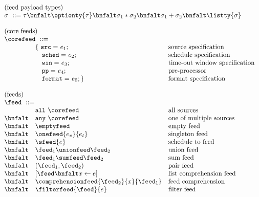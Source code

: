 \begin{figure}[t]
\[
\begin{array}{lll}
\multicolumn{3}{l}{\mbox{(feed payload types)}}\\ 
\multicolumn{3}{l}{\sigma \ ::= \tau \bnfalt \optionty{\tau} 
  \bnfalt \sigma_1 * \sigma_2
  \bnfalt \sigma_1 + \sigma_2
  \bnfalt \listty{\sigma}
}   \\  
\\
\multicolumn{3}{l}{\mbox{(core feeds)}}\\ 
\multicolumn{3}{l}{\corefeed \ ::= }\\
& \{ \ \mathtt{src=}\    e_1;    & \mbox{source specification} \\
& \ \ \ \mathtt{sched=}\  e_2;    & \mbox{schedule specification}\\
& \ \ \ \mathtt{win=}\    e_3;    & \mbox{time-out window specification} \\
& \ \ \ \mathtt{pp=}\     e_4;    & \mbox{pre-processor} \\
& \ \ \ \mathtt{format=}\ e_5; \} & \mbox{format specification}\\ 
\\
\multicolumn{3}{l}{\mbox{(feeds)}}\\ 
\multicolumn{3}{l}{\feed \ ::=}   \\  
         & \mathtt{all}\ \corefeed & \mbox{all sources}\\ 
 \bnfalt & \mathtt{any}\ \corefeed & \mbox{one of multiple sources}\\ 
 \bnfalt & \emptyfeed & \mbox{empty feed} \\
 \bnfalt & \onefeed{e_v}{e_t} & \mbox{singleton feed} \\
 \bnfalt & \sfeed{e} & \mbox{schedule to feed} \\
 \bnfalt & \feed_1 \unionfeed \feed_2 & \mbox{union feed} \\
 \bnfalt & \feed_1 \sumfeed \feed_2 & \mbox{sum feed} \\
 \bnfalt & (\feed_1, \feed_2) & \mbox{pair feed} \\
 \bnfalt & [\feed \bnfalt x \leftarrow e ] & \mbox{list comprehension feed} \\
 \bnfalt & \comprehensionfeed{\feed_2}{x}{\feed_1} & \mbox{feed comprehension} \\
 \bnfalt & \filterfeed{\feed}{e} & \mbox{filter feed} \\

\end{array}\]
\end{figure}
